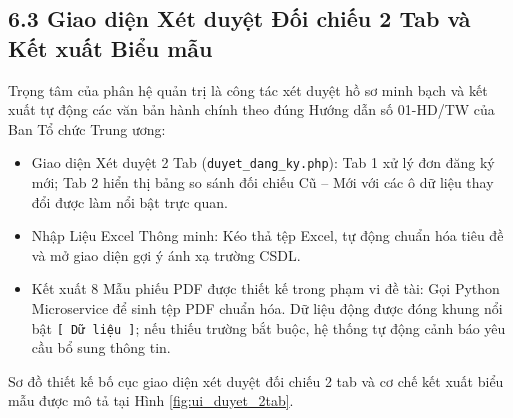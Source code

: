 \documentclass[12pt,a4paper]{report}
\begin{document}
\subsection*{6.3 Giao diện Xét duyệt Đối chiếu 2 Tab và Kết xuất Biểu mẫu}
Trọng tâm của phân hệ quản trị là công tác xét duyệt hồ sơ minh bạch và kết xuất tự động các văn bản hành chính theo đúng Hướng dẫn số 01-HD/TW của Ban Tổ chức Trung ương:
\begin{itemize}[label=--,leftmargin=*]
  \item Giao diện Xét duyệt 2 Tab (\texttt{duyet\_dang\_ky.php}): Tab 1 xử lý đơn đăng ký mới; Tab 2 hiển thị bảng so sánh đối chiếu Cũ -- Mới với các ô dữ liệu thay đổi được làm nổi bật trực quan.
  \item Nhập Liệu Excel Thông minh: Kéo thả tệp Excel, tự động chuẩn hóa tiêu đề và mở giao diện gợi ý ánh xạ trường CSDL.
  \item Kết xuất 8 Mẫu phiếu PDF được thiết kế trong phạm vi đề tài: Gọi Python Microservice để sinh tệp PDF chuẩn hóa. Dữ liệu động được đóng khung nổi bật \texttt{[ Dữ liệu ]}; nếu thiếu trường bắt buộc, hệ thống tự động cảnh báo yêu cầu bổ sung thông tin.
\end{itemize}

Sơ đồ thiết kế bố cục giao diện xét duyệt đối chiếu 2 tab và cơ chế kết xuất biểu mẫu được mô tả tại Hình \ref{fig:ui_duyet_2tab}.
\end{document}
